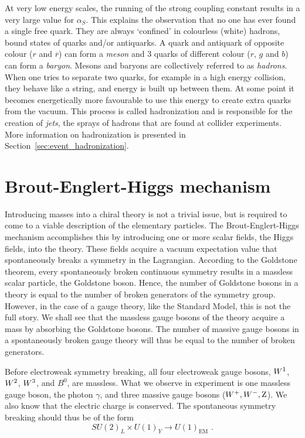 At very low energy scales, the running of the strong coupling constant results in a very large
value for $\alpha_S$. This explains the observation that no one has ever found a single free quark. 
They are always `confined' in colourless (white) hadrons, \ie bound states of quarks and/or
antiquarks.  A quark and antiquark of opposite colour (\eg $r$ and $\overline{r}$) can form a
\textit{meson} and 3 quarks of different colour ($r$, $g$ and $b$) can form a \textit{baryon}. 
Mesons and baryons are collectively referred to as \textit{hadrons}.
When one tries to separate two quarks, for example in a high energy collision, they behave like a
string, and energy is built up between them. At some point it becomes energetically more favourable
to use this energy to create extra quarks from the vacuum. 
This process is called hadronization and is responsible for the creation of \textsl{jets}, the
sprays of hadrons that are found at collider experiments. More information on hadronization is
presented in Section~\ref{sec:event_hadronization}.


\section{Brout-Englert-Higgs mechanism \label{sec:SM_HiggsMechanism}}

Introducing masses into a chiral theory is not a trivial issue, but is required to come to a viable
description of the elementary particles. 
The Brout-Englert-Higgs mechanism accomplishes this by introducing one or more scalar fields, the
Higgs fields, into the theory. These fields acquire a vacuum expectation value that spontaneously
breaks a symmetry in the Lagrangian. 
According to the Goldstone theorem, every spontaneously broken continuous symmetry
results in a massless scalar particle, the Goldstone boson. 
Hence, the number of Goldstone bosons in a theory is equal to the number of broken generators of
the symmetry group. 
However, in the case of a gauge theory, like the Standard Model, this is not the full story. 
We shall see that the massless gauge bosons of the theory acquire a mass by absorbing the Goldstone
bosons. 
The number of massive gauge bosons in a spontaneously broken gauge theory will thus be equal to the
number of broken generators. 


Before electroweak symmetry breaking, all four electroweak gauge bosons, $W^1$, $W^2$, $W^3$,
and $B^0$, are massless. What we observe in experiment is one massless gauge boson, the photon
$\gamma$, and three massive gauge bosons ($W^+, W^-, \mathrm{Z}$). We also know that the electric charge
is conserved. The spontaneous symmetry breaking should thus be of the form
\begin{equation*}
  SU(2)_L \times U(1)_Y \rightarrow U(1)_{\text{EM}} \textrm{ .}
\end{equation*}

